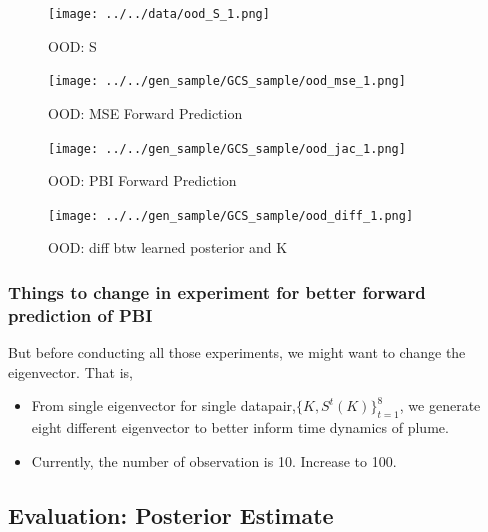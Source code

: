 \documentclass[
]{article}
\begin{document}
\begin{figure}[H]

{\centering \texttt{[image: ../../data/ood\_S\_1.png]}

}

\caption{OOD: S}

\end{figure}%
\begin{figure}[H]

{\centering \texttt{[image: ../../gen\_sample/GCS\_sample/ood\_mse\_1.png]}

}

\caption{OOD: MSE Forward Prediction}

\end{figure}%
\begin{figure}[H]

{\centering \texttt{[image: ../../gen\_sample/GCS\_sample/ood\_jac\_1.png]}

}

\caption{OOD: PBI Forward Prediction}

\end{figure}%
\begin{figure}[H]

{\centering \texttt{[image: ../../gen\_sample/GCS\_sample/ood\_diff\_1.png]}

}

\caption{OOD: diff btw learned posterior and K}

\end{figure}%

\subsubsection{Things to change in experiment for better forward
prediction of
PBI}\label{things-to-change-in-experiment-for-better-forward-prediction-of-pbi}

But before conducting all those experiments, we might want to change the
eigenvector. That is,

\begin{itemize}
\item
  From single eigenvector for single datapair,\(\{K, S^t(K)\}_{t=1}^8\),
  we generate eight different eigenvector to better inform time dynamics
  of plume.
\item
  Currently, the number of observation is 10. Increase to 100.
\end{itemize}

\subsection{Evaluation: Posterior
Estimate}\label{evaluation-posterior-estimate}
\end{document}
